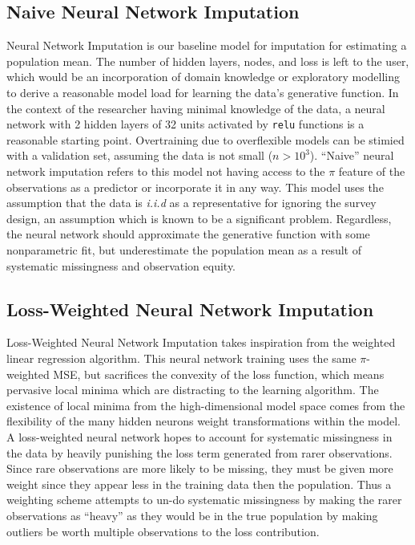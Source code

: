 \documentclass[12pt,twoside]{reedthesis}
\begin{document}
\subsection{Naive Neural Network
Imputation}\label{naive-neural-network-imputation}

Neural Network Imputation is our baseline model for imputation for
estimating a population mean. The number of hidden layers, nodes, and
loss is left to the user, which would be an incorporation of domain
knowledge or exploratory modelling to derive a reasonable model load for
learning the data's generative function. In the context of the
researcher having minimal knowledge of the data, a neural network with 2
hidden layers of 32 units activated by \texttt{relu} functions is a
reasonable starting point. Overtraining due to overflexible models can
be stimied with a validation set, assuming the data is not small
(\(n > 10^3\)). ``Naive'' neural network imputation refers to this model
not having access to the \(\pi\) feature of the observations as a
predictor or incorporate it in any way. This model uses the assumption
that the data is \emph{i.i.d} as a representative for ignoring the
survey design, an assumption which is known to be a significant problem.
Regardless, the neural network should approximate the generative
function with some nonparametric fit, but underestimate the population
mean as a result of systematic missingness and observation equity.

\subsection{Loss-Weighted Neural Network
Imputation}\label{loss-weighted-neural-network-imputation}

Loss-Weighted Neural Network Imputation takes inspiration from the
weighted linear regression algorithm. This neural network training uses
the same \(\pi\)-weighted MSE, but sacrifices the convexity of the loss
function, which means pervasive local minima which are distracting to
the learning algorithm. The existence of local minima from the
high-dimensional model space comes from the flexibility of the many
hidden neurons weight transformations within the model. A loss-weighted
neural network hopes to account for systematic missingness in the data
by heavily punishing the loss term generated from rarer observations.
Since rare observations are more likely to be missing, they must be
given more weight since they appear less in the training data then the
population. Thus a weighting scheme attempts to un-do systematic
missingness by making the rarer observations as ``heavy'' as they would
be in the true population by making outliers be worth multiple
observations to the loss contribution.
\end{document}
